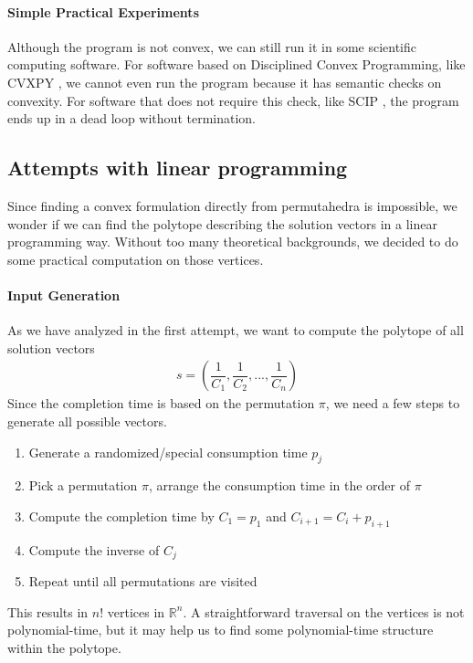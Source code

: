 \documentclass[12pt,letterpaper]{article}
\newcommand*{\R}{\mathbb{R}}
\begin{document}
\paragraph{Simple Practical Experiments}
Although the program is not convex, we can still run it in some scientific computing software.
For software based on Disciplined Convex Programming, like CVXPY \cite{diamond2016cvxpy}, we cannot even run the program 
because it has semantic checks on convexity. For software that does not require this check, like SCIP \cite{BolusaniEtal2024ZR}, the program 
ends up in a dead loop without termination. 

\subsection{Attempts with linear programming}
Since finding a convex formulation directly from permutahedra is impossible, 
we wonder if we can find the polytope describing the solution vectors in a linear programming way.
Without too many theoretical backgrounds, we decided to do some practical computation on those vertices.

\paragraph{Input Generation}
As we have analyzed in the first attempt, we want to compute the polytope of all solution vectors 
\begin{align*}
 s = \left( \dfrac{1}{C_1}, \dfrac{1}{C_2}, ..., \dfrac{1}{C_n} \right)
\end{align*}
Since the completion time is based on the permutation $\pi$, we need a few steps to generate all possible 
vectors. 
\begin{enumerate}
    \item Generate a randomized/special consumption time $p_j$
    \item Pick a permutation $\pi$, arrange the consumption time in the order of $\pi$
    \item Compute the completion time by $C_1 = p_1$ and $C_{i+1} = C_i + p_{i+1}$
    \item Compute the inverse of $C_j$
    \item Repeat until all permutations are visited
\end{enumerate}
This results in $n!$ vertices in $\R^n$. A straightforward traversal on the vertices is not 
polynomial-time, but it may help us to find some polynomial-time structure within the polytope.
\end{document}
